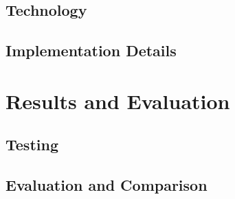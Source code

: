 \documentclass[12pt,a4paper]{article}
\begin{document}
\subsection{Technology} \label{subsection:technology}







\subsection{Implementation Details} \label{subsection:implementationdetails}





%
%
%
%
%
%
%
%
\newpage
\section{Results and Evaluation} \label{section:results}


\subsection{Testing} \label{subsection:testing}


\subsection{Evaluation and Comparison} \label{subsection:evaluationandcomparison}
\end{document}

